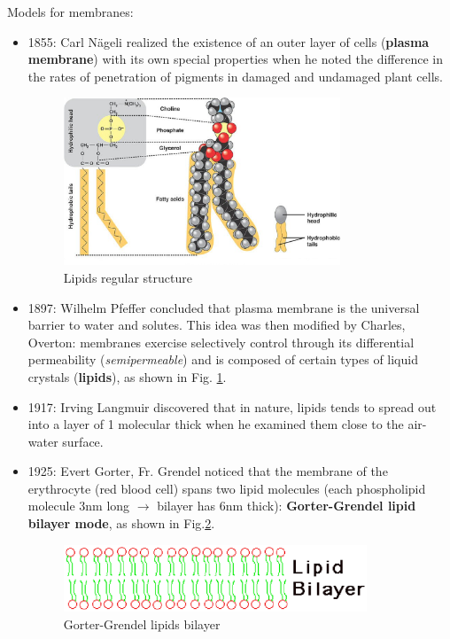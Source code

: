 Models for membranes:
\begin{itemize}

\item 1855: Carl N\"ageli realized the existence of an outer layer of
  cells ({\bf plasma membrane}) with its own special properties when
  he noted the difference in the rates of penetration of pigments in
  damaged and undamaged plant cells.

  \begin{figure}[htb]
    \centerline{\includegraphics[height=5cm]{./images/phospholipid_structure.eps}}
    \caption{Lipids regular structure}\label{fig:lipids}
  \end{figure}

\item 1897: Wilhelm Pfeffer concluded that plasma membrane is the
  universal barrier to water and solutes. This idea was then modified
  by Charles, Overton: membranes exercise selectively control through
  its differential permeability ({\it semipermeable}) and is composed
  of certain types of liquid crystals ({\bf lipids}), as shown in
  Fig. \ref{fig:lipids}.

\item 1917: Irving Langmuir discovered that in nature, lipids tends to
  spread out into a layer of 1 molecular thick when he examined them
  close to the air-water surface.

\item 1925: Evert Gorter, Fr. Grendel noticed that the membrane of the
  erythrocyte (red blood cell) spans two lipid molecules (each
  phospholipid molecule 3nm long $\longrightarrow$ bilayer has 6nm
  thick): {\bf Gorter-Grendel lipid bilayer mode}, as shown in
  Fig.\ref{fig:membrane1}.
  \begin{figure}[htb]
    \centerline{\includegraphics[height=2cm]{./images/bilayer.eps}}
    \caption{Gorter-Grendel lipids bilayer}\label{fig:membrane1}
  \end{figure}


\end{itemize}
